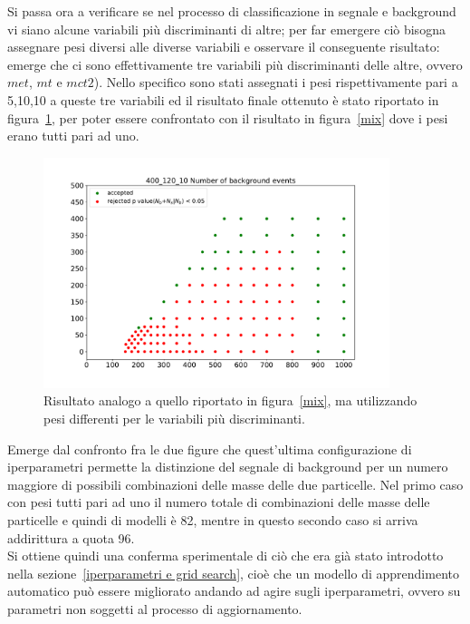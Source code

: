 \newpage

Si passa ora a verificare se nel processo di classificazione in segnale e background vi siano alcune variabili più discriminanti di altre; per far emergere ciò bisogna assegnare pesi diversi alle diverse variabili e osservare il conseguente risultato: emerge che ci sono effettivamente tre variabili più discriminanti delle altre, ovvero $\textit{met}$, $\textit{mt}$ e $\textit{mct2}$). Nello specifico sono stati assegnati i pesi rispettivamente pari a 5,10,10 a queste tre variabili ed il risultato finale ottenuto è stato riportato in figura~\ref{mix_ottimizzato}, per poter essere confrontato con il risultato in figura~\ref{mix} dove i pesi erano tutti pari ad uno.

\begin{figure}[h!]
	\centering
	\includegraphics[width=0.90\textwidth]{figs/risultati_simulazione/mix_ottimizzato.pdf}
	\caption{Risultato analogo a quello riportato in figura~\ref{mix}, ma utilizzando pesi differenti per le variabili più discriminanti.}
	\label{mix_ottimizzato}
\end{figure}

Emerge dal confronto fra le due figure che quest'ultima configurazione di iperparametri permette la distinzione del segnale di background per un numero maggiore di possibili combinazioni delle masse delle due particelle. Nel primo caso con pesi tutti pari ad uno il numero totale di combinazioni delle masse delle particelle e quindi di modelli è 82, mentre in questo secondo caso si arriva addirittura a quota 96. \\
Si ottiene quindi una conferma sperimentale di ciò che era già stato introdotto nella sezione~\ref{iperparametri e grid search}, cioè che un modello di apprendimento automatico può essere migliorato andando ad agire sugli iperparametri, ovvero su parametri non soggetti al processo di aggiornamento.

